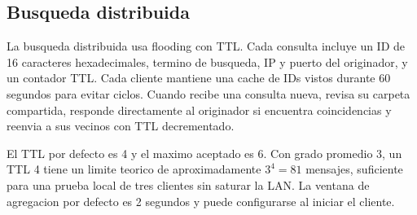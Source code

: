 \subsection{Busqueda distribuida}

La busqueda distribuida usa flooding con TTL. Cada consulta incluye un ID de
16 caracteres hexadecimales, termino de busqueda, IP y puerto del originador,
y un contador TTL. Cada cliente mantiene una cache de IDs vistos durante 60
segundos para evitar ciclos. Cuando recibe una consulta nueva, revisa su
carpeta compartida, responde directamente al originador si encuentra
coincidencias y reenvia a sus vecinos con TTL decrementado.

El TTL por defecto es 4 y el maximo aceptado es 6. Con grado promedio 3, un TTL
4 tiene un limite teorico de aproximadamente $3^4 = 81$ mensajes, suficiente
para una prueba local de tres clientes sin saturar la LAN. La ventana de
agregacion por defecto es 2 segundos y puede configurarse al iniciar el
cliente.
